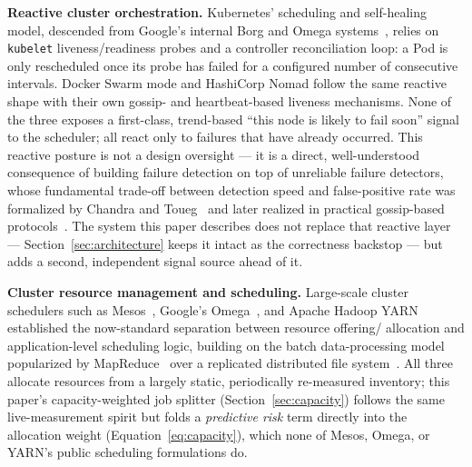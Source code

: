 \documentclass[conference]{IEEEtran}
\begin{document}
\textbf{Reactive cluster orchestration.} Kubernetes' scheduling and self-healing model, descended
from Google's internal Borg and Omega systems~\cite{burns2016borg,verma2015borg}, relies on
\texttt{kubelet} liveness/readiness probes and a controller reconciliation loop: a Pod is only
rescheduled once its probe has failed for a configured number of consecutive intervals. Docker Swarm
mode and HashiCorp Nomad follow the same reactive shape with their own gossip- and heartbeat-based
liveness mechanisms. None of the three exposes a first-class, trend-based ``this node is likely to
fail soon'' signal to the scheduler; all react only to failures that have already occurred. This
reactive posture is not a design oversight — it is a direct, well-understood consequence of building
failure detection on top of unreliable failure detectors, whose fundamental trade-off between detection
speed and false-positive rate was formalized by Chandra and Toueg~\cite{chandra1996unreliable} and
later realized in practical gossip-based protocols~\cite{vanrenesse1998gossip}. The system this paper
describes does not replace that reactive layer — Section~\ref{sec:architecture} keeps it intact as the
correctness backstop — but adds a second, independent signal source ahead of it.

\textbf{Cluster resource management and scheduling.} Large-scale cluster schedulers such as
Mesos~\cite{hindman2011mesos}, Google's Omega~\cite{schwarzkopf2013omega}, and Apache Hadoop
YARN~\cite{vavilapalli2013yarn} established the now-standard separation between resource offering/
allocation and application-level scheduling logic, building on the batch data-processing model
popularized by MapReduce~\cite{dean2004mapreduce} over a replicated distributed file
system~\cite{ghemawat2003gfs}. All three allocate resources from a largely static, periodically
re-measured inventory; this paper's capacity-weighted job splitter (Section~\ref{sec:capacity}) follows
the same live-measurement spirit but folds a \emph{predictive risk} term directly into the allocation
weight (Equation~\ref{eq:capacity}), which none of Mesos, Omega, or YARN's public scheduling
formulations do.
\end{document}

